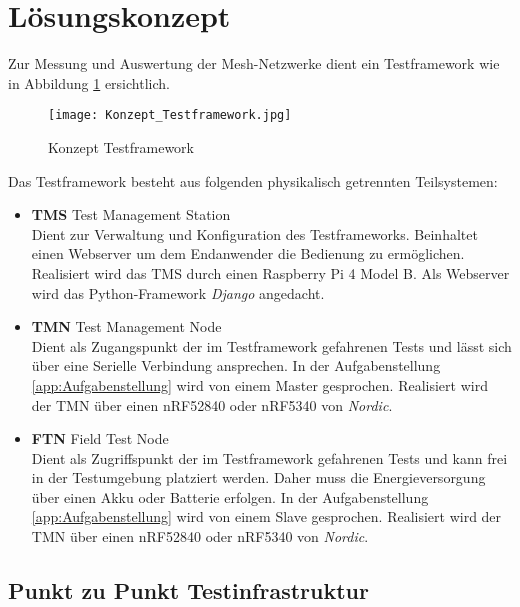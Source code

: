 \clearpage
\section{Lösungskonzept}\label{sec:Loesungskonzept}

Zur Messung und Auswertung der Mesh-Netzwerke dient ein Testframework wie in Abbildung \ref{fig:KonzeptTestframework} ersichtlich.

\begin{figure}[H]
	\centering
	\texttt{[image: Konzept\_Testframework.jpg]}
	\caption{Konzept Testframework}\label{fig:KonzeptTestframework}
\end{figure}


Das Testframework besteht aus folgenden physikalisch getrennten Teilsystemen:

\begin{itemize}
	\item \textbf{TMS} Test Management Station \\ 
	Dient zur Verwaltung und Konfiguration des Testframeworks. Beinhaltet einen Webserver um dem Endanwender die Bedienung zu ermöglichen. Realisiert wird das TMS durch einen Raspberry Pi 4 Model B. Als Webserver wird das Python-Framework \textit{Django} angedacht. 
	\item \textbf{TMN} Test Management Node \\ 
	Dient als Zugangspunkt der im Testframework gefahrenen Tests und lässt sich über eine Serielle Verbindung ansprechen. In der Aufgabenstellung \ref{app:Aufgabenstellung} wird von einem Master gesprochen. Realisiert wird der TMN über einen nRF52840 oder nRF5340 von \textit{Nordic}. 
	\item \textbf{FTN} Field Test Node \\ 
	Dient als Zugriffspunkt der im Testframework gefahrenen Tests und kann frei in der Testumgebung platziert werden. Daher muss die Energieversorgung über einen Akku oder Batterie erfolgen. In der Aufgabenstellung  \ref{app:Aufgabenstellung} wird von einem Slave gesprochen. Realisiert wird der TMN über einen nRF52840 oder nRF5340 von \textit{Nordic}.
\end{itemize}



\subsection{Punkt zu Punkt Testinfrastruktur}\label{subsec:PunktzuPunktTestinfrastruktur}


